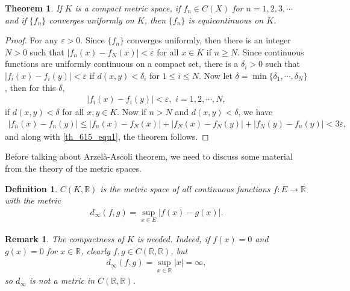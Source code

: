 \documentclass[10pt]{book}
\newtheorem{definition}{Definition}[chapter]
\newtheorem{theorem}{Theorem}[chapter]
\newtheorem{remark}{Remark}[chapter]
\theoremstyle{definition}
\numberwithin{equation}{chapter}
\begin{document}
\begin{theorem}
If $K$ is a compact metric space, if $f_n \in C(X)$ for $n = 1,2,3,\cdots$ and if $\{f_n\}$ converges uniformly on $K$, then $\{f_n\}$ is equicontinuous on $K$.
\end{theorem}
\begin{proof}
For any $\varepsilon > 0$. Since $\{f_n\}$ converges uniformly, then there is an integer $N > 0$ such that $\left|f_n(x) - f_N(x)\right| < \varepsilon$ for all $x \in K$ if $n \geq N$. Since continuous functions are uniformly continuous on a compact set, there is a $\delta_i > 0$ such that $\left|f_i(x) - f_i(y)\right| < \varepsilon$ if $d(x,y) < \delta_i$ for $1 \leq i \leq N$. Now let $\delta = \min\{\delta_1, \cdots, \delta_N\}$, then for this $\delta$, 
\begin{align}\label{th_615_equ1}
    \left|f_i(x) - f_i(y)\right| < \varepsilon, \,\, i = 1,2,\cdots,N,
\end{align}
if $d(x,y) < \delta$ for all $x,y \in K$. Now if $n > N$ and $d(x,y) < \delta$, we have
\begin{align*}
    \left|f_n(x) - f_n(y)\right| \leq \left|f_n(x) - f_N(x)\right| + \left|f_N(x) - f_N(y)\right| + \left|f_N(y) - f_n(y)\right| < 3\varepsilon,
\end{align*}
and along with \eqref{th_615_equ1}, the theorem follows.
\end{proof}

\medskip

Before talking about Arzelà-Ascoli theorem, we need to discuss some material from the theory of the metric spaces.

\medskip

\begin{definition}
$C(K,\mathbb{R})$ is the metric space of all continuous functions $f: E \to \mathbb{R}$ with the metric
\begin{align*}
    d_{\infty}(f,g) = \sup_{x \in E} \left|f(x) - g(x)\right|.
\end{align*}
\end{definition}

\begin{remark}
The compactness of $K$ is needed. Indeed, if $f(x) = 0$ and $g(x) = 0$ for $x \in \mathbb{R}$, clearly $f,g \in C(\mathbb{R},\mathbb{R})$, but 
\begin{align*}
    d_{\infty}(f,g) = \sup_{x \in \mathbb{R}} \left|x\right| = \infty,
\end{align*}
so $d_{\infty}$ is not a metric in $C(\mathbb{R},\mathbb{R})$.
\end{remark}
\end{document}
